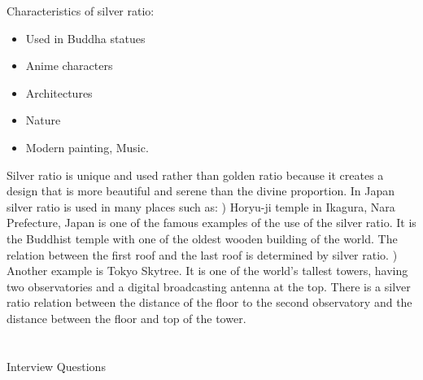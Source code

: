 \documentclass[12pt]{article}
\begin{document}
{Characteristics of silver ratio:
\begin{itemize}
  \item Used in Buddha statues
  \item Anime characters
  \item Architectures
  \item Nature
  \item Modern painting, Music.
\end{itemize}
Silver ratio is unique and used rather than golden ratio because it creates a design that is more beautiful and serene than the divine proportion. In Japan silver ratio is used in many places such as:
) Horyu-ji temple in Ikagura, Nara Prefecture, Japan is one of the famous examples of the use of the silver ratio. It is the Buddhist temple with one of the oldest wooden building of the world. The relation between the first roof and the last roof is determined by silver ratio.
) Another example is Tokyo Skytree. It is one of the world’s tallest towers, having two observatories and a digital broadcasting antenna at the top. There is a silver ratio relation between the distance of the floor to the second observatory and the distance between the floor and top of the tower.
\newpage

\section{}

{\centering
{\LARGE Interview Questions \par}
\par}
\linebreak

}
\end{document}

